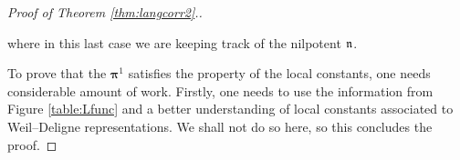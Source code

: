 \begin{proof}[Proof of Theorem \ref{thm:langcorr2}.]
\begin{enumerate}[(1)]
        where in this last case we are keeping track of the nilpotent $\mathfrak{n}$.
    \end{enumerate}
    To prove that the $\bm\pi^1$ satisfies the property of the local constants, one needs considerable amount of work. Firstly, one needs to use the information from Figure \ref{table:Lfunc} and a better understanding of local constants associated to Weil--Deligne representations. We shall not do so here, so this concludes the proof.
\end{proof}








\newpage